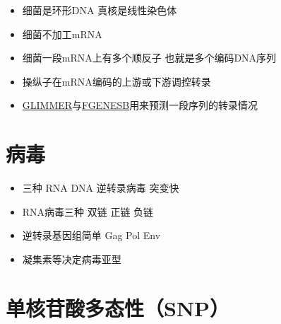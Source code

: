 \documentclass[]{book}
\providecommand{\tightlist}{%
  \setlength{\itemsep}{0pt}\setlength{\parskip}{0pt}}
\begin{document}
\begin{itemize}
\tightlist
\item
  细菌是环形DNA 真核是线性染色体
\item
  细菌不加工mRNA
\item
  细菌一段mRNA上有多个顺反子 也就是多个编码DNA序列
\item
  操纵子在mRNA编码的上游或下游调控转录
\item
  \href{http://www.ncbi.nlm.nih.gov/genomes/MICROBES/glimmer_3.cgi}{GLIMMER}与\href{http://www.softberry.com/berry.phtml?topic=fgenesb\&group=programs\&subgroup=gfindb}{FGENESB}用来预测一段序列的转录情况
\end{itemize}

\hypertarget{ux75c5ux6bd2}{%
\section{病毒}\label{ux75c5ux6bd2}}

\begin{itemize}
\tightlist
\item
  三种 RNA DNA 逆转录病毒 突变快
\item
  RNA病毒三种 双链 正链 负链
\item
  逆转录基因组简单 Gag Pol Env
\item
  凝集素等决定病毒亚型
\end{itemize}

\hypertarget{ux5355ux6838ux82f7ux9178ux591aux6001ux6027snp}{%
\section{单核苷酸多态性（SNP）}\label{ux5355ux6838ux82f7ux9178ux591aux6001ux6027snp}}
\end{document}
